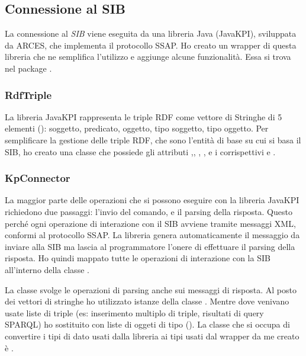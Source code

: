 \subsection{Connessione al SIB}

La connessione al \emph{SIB} viene eseguita da una libreria Java (JavaKPI), sviluppata da ARCES, che implementa il protocollo SSAP. Ho creato un wrapper di questa libreria che ne semplifica l'utilizzo e aggiunge alcune funzionalità. Essa si trova nel package .

\subsubsection{RdfTriple}
La libreria JavaKPI rappresenta le triple RDF come vettore di Stringhe di 5 elementi (): soggetto, predicato, oggetto, tipo soggetto, tipo oggetto. 
Per semplificare la gestione delle triple RDF, che sono l'entità di base su cui si basa il SIB, ho creato una classe  che possiede gli attributi ,, , ,  e i corrispettivi  e .


\subsubsection{KpConnector}

La maggior parte delle operazioni che si possono eseguire con la libreria JavaKPI richiedono due passaggi: l'invio del comando, e il parsing della risposta. Questo perché ogni operazione di interazione con il SIB avviene tramite messaggi XML, conformi al protocollo SSAP. La libreria genera automaticamente il messaggio da inviare alla SIB ma lascia al programmatore l'onere di effettuare il parsing della risposta. Ho quindi mappato tutte le operazioni di interazione con la SIB all'interno della classe .

La classe  svolge le operazioni di parsing anche sui messaggi di risposta. Al posto dei vettori di stringhe ho utilizzato istanze della classe . Mentre dove venivano usate liste di triple (es: inserimento multiplo di triple, risultati di query SPARQL) ho sostituito con liste di oggeti di tipo  (). La classe che si occupa di convertire i tipi di dato usati dalla libreria  ai tipi usati dal wrapper da me creato è .

